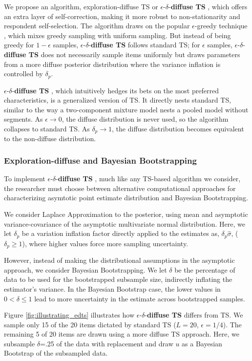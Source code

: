 \documentclass[nonblindrev]{informs3}
\newcommand{\edts}{$\epsilon$-$\delta$-\textbf{diffuse TS} }
\newcommand{\numperset}{L}
\begin{document}
We propose an algorithm, exploration-diffuse TS or \edts, which offers an extra layer of self-correction, making it more robust to non-stationarity and respondent self-selection. The algorithm draws on the popular $\epsilon$-greedy technique \citep{SuttonBarto1998}, which mixes greedy sampling with uniform sampling. But instead of being greedy for $1-\epsilon$ samples, \edts follows standard TS; for $\epsilon$ samples, \edts does not necessarily sample items uniformly but draws parameters from a more diffuse posterior distribution where the variance inflation is controlled by $\delta_p$.

\edts, which intuitively hedges its bets on the most preferred characteristics, is a generalized version of TS. It directly nests standard TS, similar to the way a two-component mixture model nests a pooled model without segments. As $\epsilon \to 0$, the diffuse distribution is never used, so the algorithm collapses to standard TS. As $\delta_p \to 1$, the diffuse distribution becomes equivalent to the non-diffuse distribution. 

\subsubsection{Exploration-diffuse and Bayesian Bootstrapping}

To implement \edts, much like any TS-based algorithm we consider, the researcher must choose between alternative computational approaches for characterizing asymtotic point estimate distribution and Bayesian Bootstrapping. 

We consider Laplace Approximation to the posterior, using mean and asymptotic variance-covariance of the asymptotic multivariate normal distribution. Here, we let $\delta_p$ be a variation inflation factor directly applied to the estimates as, $\delta_p  \hat \sigma$, ($\delta_p \geq 1$), where higher values force more sampling uncertainty.

However, instead of making the distributional assumptions in the asymptotic approach, we consider Bayesian Bootstrapping. We let $\delta$ be the percentage of data to be used for the bootstrapped subsample size, indirectly inflating the estimator's variance. In the Bayesian Bootstrap case, the lower values in $0 < \delta \leq 1$ lead to more uncertainty in the estimate across bootstrapped samples.

Figure \ref{fig:illustrating_edts} illustrates how \edts differs from TS. We sample only 15 of the 20 items dictated by standard TS ($\numperset=20$, $\epsilon=1/4$). The remaining 5 of 20 items are drawn using a more diffuse TS approach. Here, we subsample $\delta$=.25 of the data with replacement and draw $u$ as a Bayesian Bootstrap of the subsampled data. 
\end{document}
